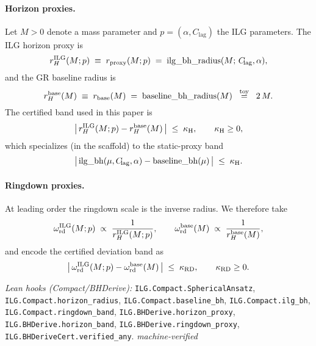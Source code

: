 \documentclass[12pt,a4paper]{article}
\begin{document}
\paragraph{Horizon proxies.}
Let \(M>0\) denote a mass parameter and \(p=(\alpha,C_{\!\mathrm{lag}})\) the ILG parameters. The ILG horizon proxy is
\begin{equation}
  r_H^{\rm ILG}(M;p) \;\equiv\; r_{\rm proxy}(M;p)
  \;=\; \mathrm{ilg\_bh\_radius}(M;\,C_{\!\mathrm{lag}},\alpha),
  \label{eq:ilg-horizon-proxy}
\end{equation}
and the GR baseline radius is
\begin{equation}
  r_H^{\rm base}(M) \;\equiv\; r_{\rm base}(M)
  \;=\; \mathrm{baseline\_bh\_radius}(M)
  \;\;\stackrel{\text{toy}}{=}\;\; 2\,M.
  \label{eq:baseline-horizon}
\end{equation}
The certified band used in this paper is
\begin{equation}
  \bigl|\,r_H^{\rm ILG}(M;p) - r_H^{\rm base}(M)\,\bigr| \;\le\; \kappa_{\rm H},
  \qquad \kappa_{\rm H}\ge 0,
  \label{eq:horizon-band}
\end{equation}
which specializes (in the scaffold) to the static-proxy band
\begin{equation}
  \bigl|\,\mathrm{ilg\_bh}( \mu, C_{\!\mathrm{lag}}, \alpha) - \mathrm{baseline\_bh}(\mu)\,\bigr| \;\le\; \kappa_{\rm H}.
  \label{eq:bh-static-band}
\end{equation}

\paragraph{Ringdown proxies.}
At leading order the ringdown scale is the inverse radius. We therefore take
\begin{equation}
  \omega_{\rm rd}^{\rm ILG}(M;p) \;\propto\; \frac{1}{r_H^{\rm ILG}(M;p)},
  \qquad
  \omega_{\rm rd}^{\rm base}(M) \;\propto\; \frac{1}{r_H^{\rm base}(M)},
  \label{eq:ringdown-proxies}
\end{equation}
and encode the certified deviation band as
\begin{equation}
  \bigl|\,\omega_{\rm rd}^{\rm ILG}(M;p) - \omega_{\rm rd}^{\rm base}(M)\,\bigr| \;\le\; \kappa_{\rm RD},
  \qquad \kappa_{\rm RD}\ge 0.
  \label{eq:ringdown-band}
\end{equation}

\noindent\emph{Lean hooks (Compact/BHDerive):}
\texttt{ILG.Compact.SphericalAnsatz}, \texttt{ILG.Compact.horizon\_radius}, 
\texttt{ILG.Compact.baseline\_bh}, \texttt{ILG.Compact.ilg\_bh}, 
\texttt{ILG.Compact.ringdown\_band}, 
\texttt{ILG.BHDerive.horizon\_proxy}, \texttt{ILG.BHDerive.horizon\_band}, 
\texttt{ILG.BHDerive.ringdown\_proxy}, \texttt{ILG.BHDeriveCert.verified\_any}. \emph{machine-verified}
\end{document}
